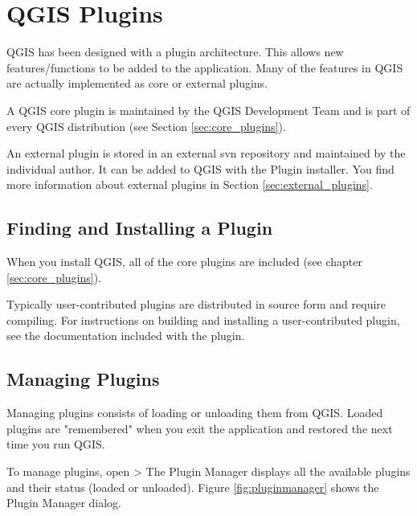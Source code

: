 \section{QGIS Plugins}

\updatedisclaimer

QGIS has been designed with a plugin architecture. This allows new 
features/functions to be added to the application. Many of the features in 
QGIS are actually implemented as core or external plugins. 

A QGIS core plugin is maintained by the QGIS Development Team 
and is part of every QGIS distribution (see Section \ref{sec:core_plugins}).

An external plugin is stored in an external svn repository and maintained 
by the individual author. It can be added to QGIS with the Plugin installer. 
You find more information about external plugins in Section 
\ref{sec:external_plugins}.

\subsection{Finding and Installing a Plugin}
When you install QGIS, all of the core plugins are included (see chapter \ref{sec:core_plugins}). 

Typically user-contributed plugins are distributed in source form and require compiling.
For instructions on building and installing a user-contributed plugin, see the documentation included with the plugin.

\subsection{Managing Plugins}\label{sec:managing_plugins}
 Managing plugins consists of loading or unloading them from QGIS.
Loaded plugins are "remembered" when you exit the application and restored the next time you run QGIS.

To manage plugins, open  > 
The Plugin Manager displays all the available plugins and their status (loaded or unloaded).
Figure \ref{fig:pluginmanager} shows the Plugin Manager dialog.


